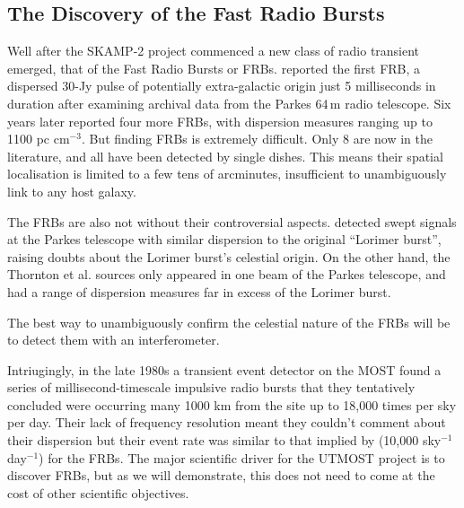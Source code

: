 \subsection{The Discovery of the Fast Radio Bursts}

Well after the SKAMP-2 project commenced a new class of radio transient emerged, that of the Fast Radio Bursts or FRBs. \cite{Lorimer_2007} reported the first FRB, a dispersed 30-Jy pulse of potentially extra-galactic origin just 5 milliseconds in duration after examining archival data from the Parkes 64\,m radio telescope. Six years later \citep{Thornton_2013} reported four more FRBs, with dispersion measures ranging up to 1100 pc cm$^{-3}$. But finding FRBs is extremely difficult\cite{Keane_2012}. Only 8 are now in the literature, and all have been detected by single dishes. This means their spatial localisation is limited to a few tens of arcminutes, insufficient to unambiguously link to any host galaxy.

The FRBs are also not without their controversial aspects. \cite{Burke_Spolaor_2011} detected swept signals at the Parkes telescope with similar dispersion to the original ``Lorimer burst'', raising doubts about the Lorimer burst's celestial origin. On the other hand, the Thornton et al. sources only appeared in one beam of the Parkes telescope, and had a range of dispersion measures far in excess of the Lorimer burst.

The best way to unambiguously confirm the celestial nature of the FRBs will be to detect them with an interferometer.

 Intriugingly, in the late 1980s a transient event detector on the MOST found a series of millisecond-timescale impulsive radio bursts that they tentatively concluded were occurring many 1000 km from the site up to 18,000 times per sky per day\cite{AMY}. Their lack of frequency resolution meant they couldn't comment about their dispersion but their event rate was similar to that implied by \citep{Thornton_2013} (10,000 sky$^{-1}$ day$^{-1}$) for the FRBs. The major scientific driver for the UTMOST project is to discover FRBs, but as we will demonstrate, this does not need to come at the cost of other scientific objectives.